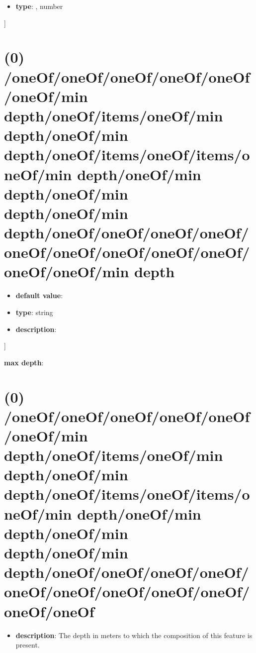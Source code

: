\begin{itemize}[leftmargin=5em]\item {\bf type}: , number\end{itemize}]\section{(0) /oneOf/oneOf/oneOf/oneOf/oneOf/oneOf/min depth/oneOf/items/oneOf/min depth/oneOf/min depth/oneOf/items/oneOf/items/oneOf/min depth/oneOf/min depth/oneOf/min depth/oneOf/min depth/oneOf/oneOf/oneOf/oneOf/oneOf/oneOf/oneOf/oneOf/oneOf/oneOf/oneOf/min depth}
\begin{itemize}[leftmargin=0em]\item {\bf default value}: 
\item {\bf type}: string
\item {\bf description}: 
\end{itemize}]\item {\bf max depth}: \section{(0) /oneOf/oneOf/oneOf/oneOf/oneOf/oneOf/min depth/oneOf/items/oneOf/min depth/oneOf/min depth/oneOf/items/oneOf/items/oneOf/min depth/oneOf/min depth/oneOf/min depth/oneOf/min depth/oneOf/oneOf/oneOf/oneOf/oneOf/oneOf/oneOf/oneOf/oneOf/oneOf/oneOf}
\begin{itemize}[leftmargin=0em]\item {\bf description}: The depth in meters to which the composition of this feature is present.
\end{itemize}
